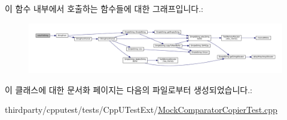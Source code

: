 이 함수 내부에서 호출하는 함수들에 대한 그래프입니다.\+:
\nopagebreak
\begin{figure}[H]
\begin{center}
\leavevmode
\includegraphics[width=350pt]{class_my_type_for_testing_comparator_ac1977e0f262ffd2668247d9b3c565722_cgraph}
\end{center}
\end{figure}




이 클래스에 대한 문서화 페이지는 다음의 파일로부터 생성되었습니다.\+:\begin{DoxyCompactItemize}
\item 
thirdparty/cpputest/tests/\+Cpp\+U\+Test\+Ext/\hyperlink{_mock_comparator_copier_test_8cpp}{Mock\+Comparator\+Copier\+Test.\+cpp}\end{DoxyCompactItemize}
